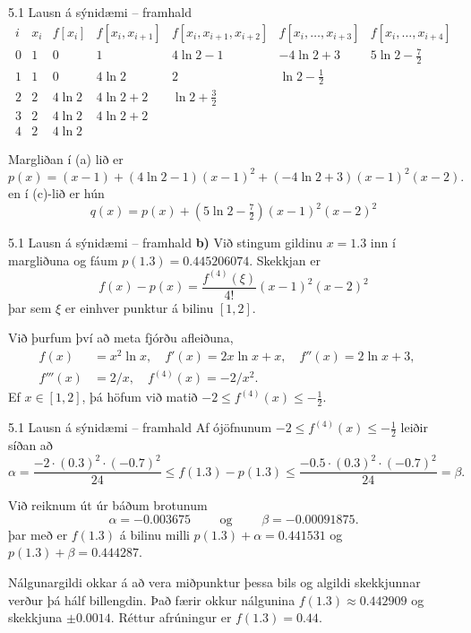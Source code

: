 \begin{frame}{5.1 Lausn á sýnidæmi -- framhald} 
$$
\begin{matrix}
i&x_i & f[x_i] &f[x_i,x_{i+1}] & f[x_i,x_{i+1},x_{i+2}] &
f[x_i,\dots,x_{i+3}]&f[x_i,\dots,x_{i+4}] \\\hline
0&1&0     &1       &4\ln 2-1        &-4\ln 2+3& 5\ln 2-\tfrac 72\\
1&1&0     &4\ln 2  &2               &\ln 2-\tfrac 12\\
2&2&4\ln 2&4\ln 2+2&\ln 2+\tfrac 32\\
3&2&4\ln 2&4\ln 2+2\\
4&2&4\ln 2
\end{matrix}
$$

\pause
Margliðan í (a) lið er  
$$p(x)=(x-1)+(4\ln 2-1)(x-1)^2+(-4\ln 2+3)(x-1)^2(x-2).
$$
en í (c)-lið er hún
$$
q(x)=p(x)+(5\ln 2-\tfrac 72)(x-1)^2(x-2)^2
$$
\end{frame}

\begin{frame}{5.1 Lausn á sýnidæmi -- framhald} 
{\bf b)}  Við stingum gildinu $x=1.3$ inn í margliðuna og fáum
 $p(1.3)=0.445206074$. Skekkjan er
$$
f(x)-p(x)=\dfrac{f^{(4)}(\xi)}{4!}(x-1)^2(x-2)^2
$$ 
þar sem $\xi$ er einhver punktur á bilinu $[1,2]$.

\pause
\smallskip  
Við þurfum því að meta fjórðu afleiðuna,
\begin{align*}
f(x) &=x^2\ln x, \quad
f'(x)=2x\ln x+x, \quad
f''(x)=2\ln x+3, \quad
\\  
f'''(x)& =2/x, \quad
f^{(4)}(x)=-2/x^2.
\end{align*}
Ef $x\in [1,2]$, þá höfum við matið
$-2\leq f^{(4)}(x)\leq -\tfrac 12$. 
\end{frame}

\begin{frame}{5.1 Lausn á sýnidæmi -- framhald} 
Af ójöfnunum  $-2\leq f^{(4)}(x)\leq -\tfrac 12$
leiðir síðan að
$$
\alpha=\dfrac{-2\cdot(0.3)^2\cdot(-0.7)^2}{24}\leq f(1.3)-p(1.3)
\leq \dfrac{-0.5\cdot(0.3)^2\cdot(-0.7)^2}{24}=\beta.
$$

\pause
\smallskip
 Við reiknum út úr báðum brotunum
$$\alpha=-0.003675 \qquad \text{ og } \qquad 
\beta=-0.00091875.
$$
þar með er $f(1.3)$ á bilinu milli 
$p(1.3)+\alpha=0.441531$ og $p(1.3)+\beta=0.444287$.


\pause
Nálgunargildi okkar á að vera miðpunktur þessa bils og 
algildi skekkjunnar verður þá hálf billengdin.
Það færir okkur nálgunina
$f(1.3) \approx 0.442909$ og skekkjuna $\pm 0.0014$.
Réttur afrúningur er $f(1.3)=0.44$.
\end{frame}

